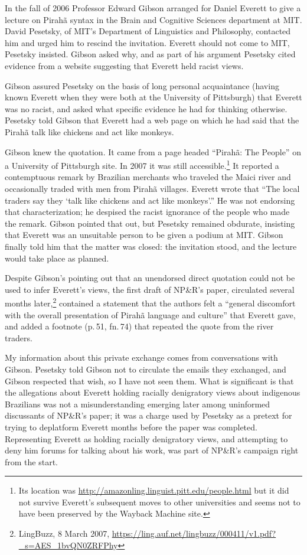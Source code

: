 \documentclass[output=paper,colorlinks,citecolor=brown
]{langscibook}
\begin{document}
In the fall of 2006 Professor Edward Gibson arranged for Daniel
Everett to give a lecture on Pirahã syntax in the Brain and
Cognitive Sciences department at MIT. David Pesetsky, of MIT's
Department of Linguistics and Philosophy, contacted him and
urged him to rescind the invitation. Everett should not come to
MIT, Pesetsky insisted. Gibson asked why, and as part of his argument
Pesetsky cited evidence from a website suggesting that Everett held
racist views.

Gibson assured Pesetsky on the basis of long personal acquaintance
(having known Everett when they were both at the University of
Pittsburgh) that Everett was no racist, and asked what specific
evidence he had for thinking otherwise. Pesetsky told Gibson that
Everett had a web page on which he had said that the Pirahã
talk like chickens and act like monkeys.

Gibson knew the quotation. It came from a page headed ``Pirahã:
The People'' on a University of Pittsburgh site. In 2007 it was still
accessible.\footnote{%
  Its location was \url{http://amazonling.linguist.pitt.edu/people.html}
  but it did not survive Everett's subsequent moves to other universities
  and seems not to have been preserved by the Wayback Machine site.}
It reported a contemptuous remark by Brazilian merchants who traveled
the Maici river and occasionally traded with men from Pirahã villages.
Everett wrote that ``The local traders say they `talk like chickens and
act like monkeys'.'' He was not endorsing that characterization; he
despised the racist ignorance of the people who made the remark. Gibson
pointed that out, but Pesetsky remained obdurate, insisting that Everett
was an unsuitable person to be given a podium at MIT. Gibson finally
told him that the matter was closed: the invitation stood, and the
lecture would take place as planned.

Despite Gibson's pointing out that an unendorsed direct quotation could
not be used to infer Everett's views, the first draft of NP\&R's paper,
circulated several months later,\footnote{%
   LingBuzz, 8 March 2007,
   \url{https://ling.auf.net/lingbuzz/000411/v1.pdf?_s=AES_1bvQN0ZRFPhy}}
contained a statement that the authors felt a ``general discomfort with
the overall presentation of Pirahã language and culture'' that Everett
gave, and added a footnote (p.\,51, fn.\,74) that repeated the quote
from the river traders.

My information about this private exchange comes from conversations with
Gibson. Pesetsky told Gibson not to circulate the emails they exchanged,
and Gibson respected that wish, so I have not seen them. What is
significant is that the allegations about Everett holding racially
denigratory views about indigenous Brazilians was not a misunderstanding
emerging later among uninformed discussants of NP\&R's paper; it was a
charge used by Pesetsky as a pretext for trying to deplatform Everett
months before the paper was completed. Representing Everett as holding
racially denigratory views, and attempting to deny him forums for talking
about his work, was part of NP\&R’s campaign right from the start.
\end{document}
